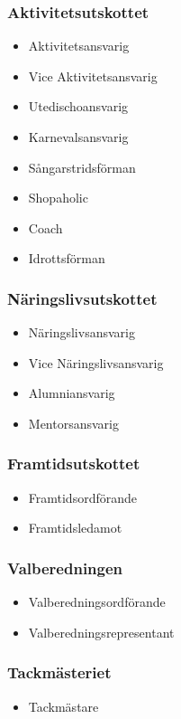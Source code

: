 \documentclass{dsekprotokoll}
\begin{document}
\begin{multicols}{2}
  \subsubsection*{Aktivitetsutskottet}
  \begin{itemize}
    \item Aktivitetsansvarig
    \item Vice Aktivitetsansvarig
    \item Utedischoansvarig
    \item Karnevalsansvarig
    \item Sångarstridsförman
    \item Shopaholic
    \item Coach
    \item Idrottsförman
  \end{itemize}
  \subsubsection*{Näringslivsutskottet}
  \begin{itemize}
    \item Näringslivsansvarig
    \item Vice Näringslivsansvarig
    \item Alumniansvarig
    \item Mentorsansvarig
  \end{itemize}
  \subsubsection*{Framtidsutskottet}
  \begin{itemize}
    \item Framtidsordförande
    \item Framtidsledamot
  \end{itemize}

  \subsubsection*{Valberedningen}
  \begin{itemize}
    \item Valberedningsordförande
    \item Valberedningsrepresentant
  \end{itemize}

  \subsubsection*{Tackmästeriet}
  \begin{itemize}
    \item Tackmästare
  \end{itemize}


\end{multicols}
\end{document}
